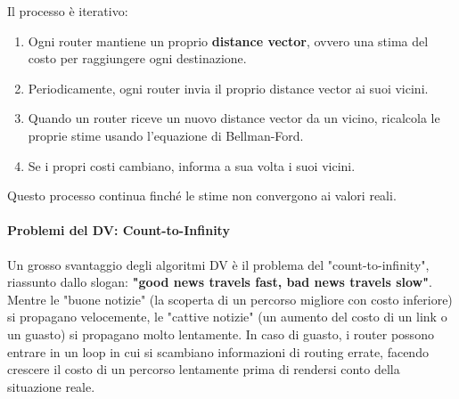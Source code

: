 Il processo è iterativo:
\begin{enumerate}
    \item Ogni router mantiene un proprio \textbf{distance vector}, ovvero una stima del costo per raggiungere ogni destinazione.
    \item Periodicamente, ogni router invia il proprio distance vector ai suoi vicini.
    \item Quando un router riceve un nuovo distance vector da un vicino, ricalcola le proprie stime usando l'equazione di Bellman-Ford.
    \item Se i propri costi cambiano, informa a sua volta i suoi vicini.
\end{enumerate}

Questo processo continua finché le stime non convergono ai valori reali.

\paragraph{Problemi del DV: Count-to-Infinity}
Un grosso svantaggio degli algoritmi DV è il problema del "count-to-infinity", riassunto dallo slogan: \textbf{"good news travels fast, bad news travels slow"}. Mentre le "buone notizie" (la scoperta di un percorso migliore con costo inferiore) si propagano velocemente, le "cattive notizie" (un aumento del costo di un link o un guasto) si propagano molto lentamente. In caso di guasto, i router possono entrare in un loop in cui si scambiano informazioni di routing errate, facendo crescere il costo di un percorso lentamente prima di rendersi conto della situazione reale.


